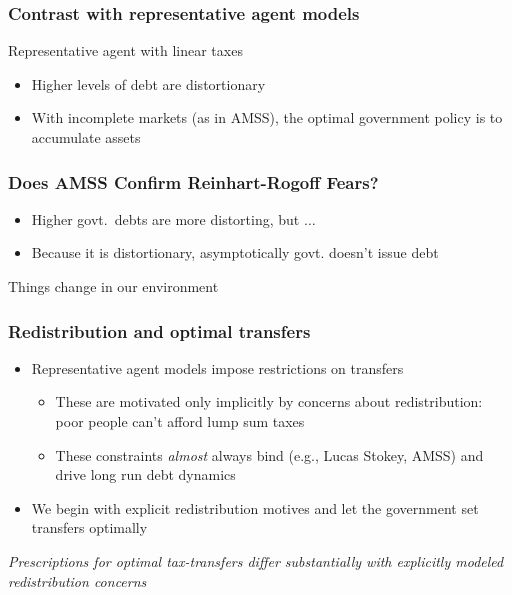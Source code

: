 \documentclass{beamer}
\begin{document}
\begin{frame}
\frametitle{Contrast with representative agent models}
 Representative agent with linear taxes
\begin{itemize}
 \item Higher levels of debt are distortionary
 \item With incomplete markets (as in  AMSS), the optimal  government policy is to accumulate assets
 \end{itemize}

 \end{frame}
 
 \begin{frame}
 \frametitle{Does AMSS Confirm Reinhart-Rogoff Fears?}
 \begin{itemize}
 \item Higher govt.\ debts are more  distorting, but $\ldots$
 \item Because it is distortionary, asymptotically govt. doesn't issue debt
 \end{itemize}
 Things change in our environment
 \end{frame}

 \begin{frame}
 \frametitle{Redistribution and optimal transfers}
 \begin{itemize}
  \item Representative agent models impose restrictions on transfers
  \begin{itemize}
 \item These are motivated only implicitly by concerns about  redistribution:  poor people can't afford lump sum taxes
  \item These constraints \emph{almost} always bind (e.g.,  Lucas Stokey, AMSS) and drive long run debt dynamics
  \end{itemize}
\item We begin with explicit redistribution motives  and let the government set transfers optimally
 \end{itemize}

 \vspace{4mm}
 \color{red}\emph{Prescriptions for optimal tax-transfers differ substantially with explicitly modeled redistribution concerns}
 \end{frame}
\end{document}
